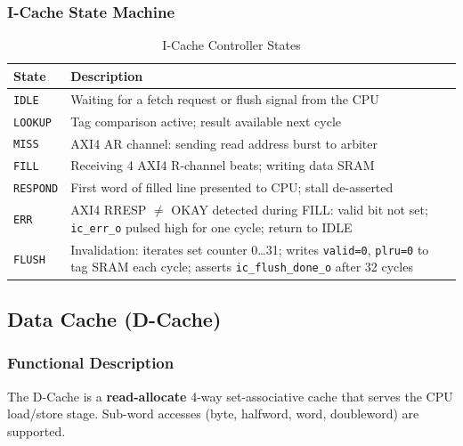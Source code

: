 \subsubsection{I-Cache State Machine}
\label{subsec:icacheFsm}

\begin{table}[H]
\caption{I-Cache Controller States}
\label{tab:asICacheFsm}
\centering
\begin{tabularx}{\textwidth}{|l |X |}
  \hline
  State & Description \\
  \hline
  \hline
  \texttt{IDLE}      & Waiting for a fetch request or flush signal from the CPU \\
  \hline
  \texttt{LOOKUP}    & Tag comparison active; result available next cycle \\
  \hline
  \texttt{MISS}      & AXI4 AR channel: sending read address burst to arbiter \\
  \hline
  \texttt{FILL}      & Receiving 4 AXI4 R-channel beats; writing data SRAM \\
  \hline
  \texttt{RESPOND}   & First word of filled line presented to CPU; stall de-asserted \\
  \hline
  \texttt{ERR}       & AXI4 RRESP $\neq$ OKAY detected during FILL: valid bit not
                       set; \texttt{ic\_err\_o} pulsed high for one cycle;
                       return to IDLE \\
  \hline
  \texttt{FLUSH}     & Invalidation: iterates set counter 0\ldots31; writes
                       \texttt{valid=0}, \texttt{plru=0} to tag SRAM each cycle;
                       asserts \texttt{ic\_flush\_done\_o} after 32 cycles \\
  \hline
\end{tabularx}
\end{table}

\subsection{Data Cache (D-Cache)}

\subsubsection{Functional Description}

The D-Cache is a \textbf{read-allocate} 4-way set-associative cache that
serves the CPU load/store stage.
Sub-word accesses (byte, halfword, word, doubleword) are supported.

